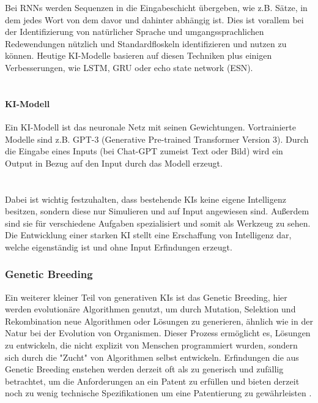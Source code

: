 Bei RNNs werden Sequenzen in die Eingabeschicht übergeben, 
wie z.B. Sätze, 
in dem jedes Wort von dem davor und dahinter abhängig ist. 
Dies ist vorallem bei der Identifizierung von natürlicher Sprache 
und umgangssprachlichen Redewendungen nützlich und  
Standardfloskeln identifizieren und nutzen zu können.
\cite{WasSindRekurrente2023}
Heutige KI-Modelle basieren auf diesen Techniken plus einigen Verbesserungen,
wie \gls{LSTM}, \gls{GRU} 
oder echo state network (ESN).
\\
\\
\paragraph{KI-Modell}
Ein KI-Modell ist das neuronale Netz mit seinen Gewichtungen. 
Vortrainierte Modelle sind z.B. GPT-3 (Generative Pre-trained Transformer Version 3).
\cite{KuenstlicheIntelligenzKI}
Durch die Eingabe eines Inputs (bei Chat-GPT zumeist Text oder Bild) 
wird ein Output in Bezug auf den Input durch das Modell erzeugt.
\\
\\
\paragraph{}
Dabei ist wichtig festzuhalten, dass bestehende KIs keine 
eigene Intelligenz besitzen, sondern diese nur Simulieren 
und auf Input angewiesen sind. Außerdem sind sie für 
verschiedene Aufgaben spezialisiert und somit als Werkzeug zu sehen. 
Die Entwicklung einer starken KI stellt eine Erschaffung von Intelligenz dar,
welche eigenständig ist und ohne Input Erfindungen erzeugt.

\subsubsection{Genetic Breeding}
Ein weiterer kleiner Teil von generativen KIs ist das Genetic Breeding, 
hier werden evolutionäre Algorithmen genutzt, 
um durch Mutation, Selektion und Rekombination 
neue Algorithmen oder Lösungen zu generieren, 
ähnlich wie in der Natur bei der Evolution von Organismen.
Dieser Prozess ermöglicht es, Lösungen zu entwickeln, 
die nicht explizit von Menschen programmiert wurden, 
sondern sich durch die "Zucht" von Algorithmen 
selbst entwickeln.
Erfindungen die aus Genetic Breeding enstehen werden derzeit
oft als zu generisch und zufällig betrachtet, 
um die Anforderungen an ein Patent zu erfüllen und bieten
derzeit noch zu wenig technische Spezifikationen 
um eine Patentierung zu gewährleisten 
\cite{hartmannKuenstlicheIntelligenzIm2020}.




\newpage

